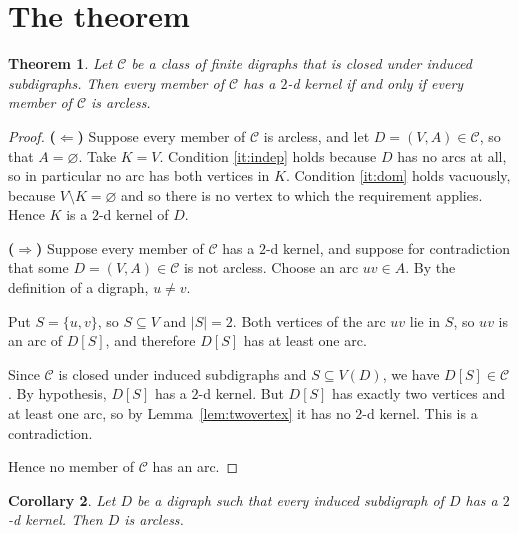 \documentclass[11pt]{article}
\theoremstyle{plain}
\newtheorem{theorem}{Theorem}[section]
\newtheorem{corollary}[theorem]{Corollary}
\theoremstyle{definition}
\theoremstyle{remark}
\begin{document}
\section{The theorem}

\begin{theorem}\label{thm:main}
Let $\mathcal{C}$ be a class of finite digraphs that is closed under induced subdigraphs.
Then every member of $\mathcal{C}$ has a $2$-d kernel if and only if every member of
$\mathcal{C}$ is arcless.
\end{theorem}

\begin{proof}
\textbf{($\Leftarrow$)} Suppose every member of $\mathcal{C}$ is arcless, and let
$D = (V,A) \in \mathcal{C}$, so that $A = \varnothing$. Take $K = V$. Condition
\ref{it:indep} holds because $D$ has no arcs at all, so in particular no arc has both
vertices in $K$. Condition \ref{it:dom} holds vacuously, because $V \setminus K = \varnothing$
and so there is no vertex to which the requirement applies. Hence $K$ is a $2$-d kernel of
$D$.

\medskip
\noindent\textbf{($\Rightarrow$)} Suppose every member of $\mathcal{C}$ has a $2$-d kernel,
and suppose for contradiction that some $D = (V,A) \in \mathcal{C}$ is not arcless. Choose an
arc $uv \in A$. By the definition of a digraph, $u \neq v$.

Put $S = \{u, v\}$, so $S \subseteq V$ and $\lvert S \rvert = 2$. Both vertices of the arc
$uv$ lie in $S$, so $uv$ is an arc of $D[S]$, and therefore $D[S]$ has at least one arc.

Since $\mathcal{C}$ is closed under induced subdigraphs and $S \subseteq V(D)$, we have
$D[S] \in \mathcal{C}$. By hypothesis, $D[S]$ has a $2$-d kernel. But $D[S]$ has exactly two
vertices and at least one arc, so by Lemma~\ref{lem:twovertex} it has no $2$-d kernel. This is a
contradiction.

Hence no member of $\mathcal{C}$ has an arc.
\end{proof}

\begin{corollary}\label{cor:vacuous}
Let $D$ be a digraph such that every induced subdigraph of $D$ has a $2$-d kernel. Then $D$
is arcless.
\end{corollary}
\end{document}
